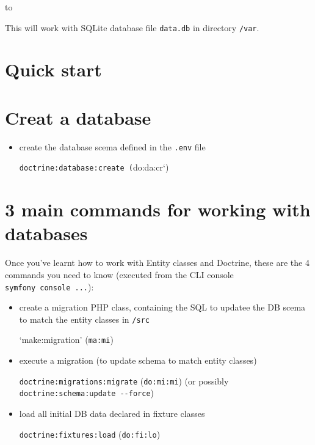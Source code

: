 \documentclass[a4paperpaper,openright]{book}
\newenvironment{Shaded}{}{}
\newcommand{\NormalTok}[1]{#1}
\newcommand{\VariableTok}[1]{\textcolor[rgb]{0.10,0.09,0.49}{#1}}
\begin{document}
to

\begin{Shaded}
\end{Shaded}

This will work with SQLite database file \texttt{data.db} in directory
\texttt{/var}.

\hypertarget{quick-start}{%
\section{Quick start}\label{quick-start}}

\hypertarget{creat-a-database}{%
\section{Creat a database}\label{creat-a-database}}

\begin{itemize}
\item
  create the database scema defined in the \texttt{.env} file

  \texttt{doctrine:database:create\textquotesingle{}\ (}do:da:cr`)
\end{itemize}

\hypertarget{main-commands-for-working-with-databases}{%
\section{3 main commands for working with
databases}\label{main-commands-for-working-with-databases}}

Once you've learnt how to work with Entity classes and Doctrine, these
are the 4 commands you need to know (executed from the CLI console
\texttt{symfony\ console\ ...}):

\begin{itemize}
\item
  create a migration PHP class, containing the SQL to updatee the DB
  scema to match the entity classes in \texttt{/src}

  `make:migration' (\texttt{ma:mi})
\item
  execute a migration (to update schema to match entity classes)

  \texttt{doctrine:migrations:migrate} (\texttt{do:mi:mi}) (or possibly
  \texttt{doctrine:schema:update\ -\/-force})
\item
  load all initial DB data declared in fixture classes

  \texttt{doctrine:fixtures:load} (\texttt{do:fi:lo})
\end{itemize}
\end{document}
